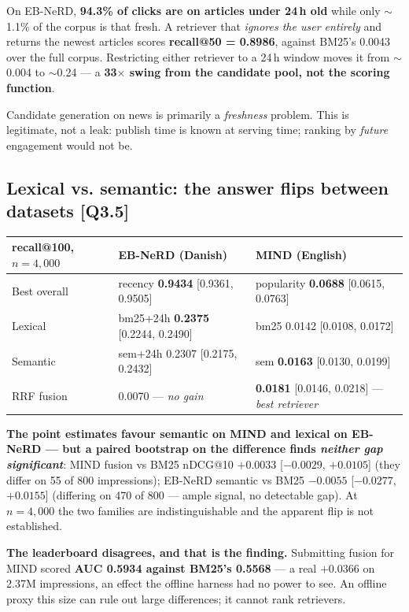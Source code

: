 \documentclass[10pt,a4paper]{article}
\newcommand{\F}[1]{\textcolor{blue!55!black}{\footnotesize[#1]}}
\begin{document}
On EB-NeRD, \textbf{94.3\% of clicks are on articles under 24\,h old} while only $\sim$1.1\% of the
corpus is that fresh. A retriever that \emph{ignores the user entirely} and returns the newest
articles scores \textbf{recall@50 = 0.8986}, against BM25's 0.0043 over the full corpus. Restricting
either retriever to a 24\,h window moves it from $\sim$0.004 to $\sim$0.24 --- a \textbf{33$\times$
swing from the candidate pool, not the scoring function}.

Candidate generation on news is primarily a \emph{freshness} problem. This is legitimate, not a leak:
publish time is known at serving time; ranking by \emph{future} engagement would not be.

\subsection{Lexical vs. semantic: the answer flips between datasets \F{Q3.5}}

\begin{center}\footnotesize
\begin{tabular}{@{}lll@{}}
\toprule
\textbf{recall@100}, $n{=}4{,}000$ & \textbf{EB-NeRD (Danish)} & \textbf{MIND (English)} \\
\midrule
Best overall & recency \textbf{0.9434} [0.9361, 0.9505] & popularity \textbf{0.0688} [0.0615, 0.0763] \\
Lexical & bm25+24h \textbf{0.2375} [0.2244, 0.2490] & bm25 0.0142 [0.0108, 0.0172] \\
Semantic & sem+24h 0.2307 [0.2175, 0.2432] & sem \textbf{0.0163} [0.0130, 0.0199] \\
RRF fusion & 0.0070 --- \emph{no gain} & \textbf{0.0181} [0.0146, 0.0218] --- \emph{best retriever} \\
\bottomrule
\end{tabular}
\end{center}

\textbf{The point estimates favour semantic on MIND and lexical on EB-NeRD --- but a paired
bootstrap on the difference finds \emph{neither gap significant}}: MIND fusion vs BM25 nDCG@10
$+0.0033$ [$-0.0029$, $+0.0105$] (they differ on 55 of 800 impressions); EB-NeRD semantic vs BM25
$-0.0055$ [$-0.0277$, $+0.0155$] (differing on 470 of 800 --- ample signal, no detectable gap). At
$n=4{,}000$ the two families are indistinguishable and the apparent flip is not established.

\textbf{The leaderboard disagrees, and that is the finding.} Submitting fusion for MIND scored
\textbf{AUC 0.5934 against BM25's 0.5568} --- a real $+0.0366$ on 2.37M impressions, an effect the
offline harness had no power to see. An offline proxy this size can rule out large differences; it
cannot rank retrievers.
\end{document}

